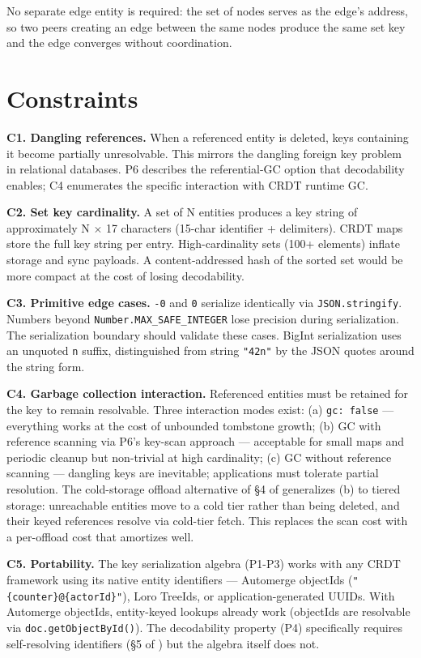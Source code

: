 No separate edge entity is required: the set of nodes serves as the edge's address, so two peers creating an edge between the same nodes produce the same set key and the edge converges without coordination.

\section{Constraints}

\textbf{C1. Dangling references.} When a referenced entity is deleted, keys containing it become partially unresolvable. This mirrors the dangling foreign key problem in relational databases. P6 describes the referential-GC option that decodability enables; C4 enumerates the specific interaction with CRDT runtime GC.

\textbf{C2. Set key cardinality.} A set of N entities produces a key string of approximately N $\times$ 17 characters (15-char identifier + delimiters). CRDT maps store the full key string per entry. High-cardinality sets (100+ elements) inflate storage and sync payloads. A content-addressed hash of the sorted set would be more compact at the cost of losing decodability.

\textbf{C3. Primitive edge cases.} \texttt{-0} and \texttt{0} serialize identically via \texttt{JSON.stringify}. Numbers beyond \texttt{Number.MAX\_SAFE\_INTEGER} lose precision during serialization. The serialization boundary should validate these cases. BigInt serialization uses an unquoted \texttt{n} suffix, distinguished from string \texttt{"42n"} by the JSON quotes around the string form.

\textbf{C4. Garbage collection interaction.} Referenced entities must be retained for the key to remain resolvable. Three interaction modes exist: (a) \texttt{gc: false} --- everything works at the cost of unbounded tombstone growth; (b) GC with reference scanning via P6's key-scan approach --- acceptable for small maps and periodic cleanup but non-trivial at high cardinality; (c) GC without reference scanning --- dangling keys are inevitable; applications must tolerate partial resolution. The cold-storage offload alternative of \S 4 of \cite{plexus:arch} generalizes (b) to tiered storage: unreachable entities move to a cold tier rather than being deleted, and their keyed references resolve via cold-tier fetch. This replaces the scan cost with a per-offload cost that amortizes well.

\textbf{C5. Portability.} The key serialization algebra (P1-P3) works with any CRDT framework using its native entity identifiers --- Automerge objectIds (\texttt{"\{counter\}@\{actorId\}"}), Loro TreeIds, or application-generated UUIDs. With Automerge objectIds, entity-keyed lookups already work (objectIds are resolvable via \texttt{doc.getObjectById()}). The decodability property (P4) specifically requires self-resolving identifiers (\S 5 of \cite{plexus:arch}) but the algebra itself does not.

